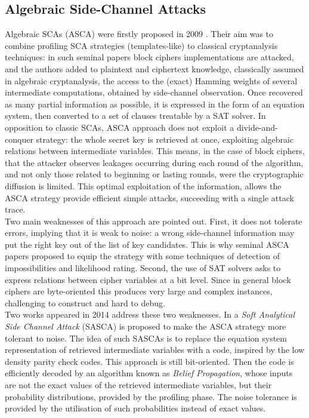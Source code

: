 \subsection{Algebraic Side-Channel Attacks}
Algebraic SCAs (ASCA) were firstly proposed in 2009 \cite{ASCA,renauld2009algebraic}. Their aim was to combine profiling SCA strategies (templates-like) to classical cryptanalysis techniques: in such seminal papers block ciphers implementations are attacked, and the authors added to plaintext and ciphertext knowledge, classically assumed in algebraic cryptanalysis, the access to the (exact) Hamming weights of  several intermediate computations, obtained by side-channel observation. Once recovered as many partial information as possible, it is expressed in the form of an equation system, then converted to a set of clauses treatable by a SAT solver. In opposition to classic SCAs, ASCA approach does not exploit a divide-and-conquer strategy: the whole secret key is retrieved at once, exploiting algebraic relations between intermediate variables. This means, in the case of block ciphers, that the attacker observes leakages occurring during each round of the algorithm, and not only those related to beginning or lasting rounds, were the cryptographic diffusion is limited. This optimal exploitation of the information, allows the ASCA strategy provide efficient simple attacks, \ie succeeding with a single attack trace.\\
Two main weaknesses of this approach are pointed out. First, it does not tolerate errors, implying that it is weak to noise: a wrong side-channel information may put the right key out of the list of key candidates. This is why seminal ASCA papers proposed to equip the strategy with some techniques of detection of impossibilities and likelihood rating. Second, the use of SAT solvers asks to express relations between cipher variables at a bit level. Since in general block ciphers are byte-oriented this produces very large and complex instances, challenging to construct and hard to debug.\\
Two works appeared in 2014 address these two weaknesses. In \cite{soft} a \emph{Soft Analytical Side Channel Attack} (SASCA) is proposed to make the ASCA strategy more tolerant to noise. The idea of such SASCAs is to replace the equation system representation of retrieved intermediate variables with a code, inspired by the low density parity check codes. This approach is still bit-oriented. Then the code is efficiently decoded by an algorithm known as \emph{Belief Propagation}, whose inputs are not the exact values of the retrieved intermediate variables, but their probability distributions, provided by the profiling phase. The noise tolerance is provided by the utilisation of such probabilities instead of exact values. \\
